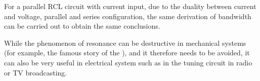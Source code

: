 For a parallel RCL circuit with current input, due to the duality between 
current and voltage, parallel and series configuration, the same derivation
of bandwidth can be carried out to obtain the same conclusions. 

While the phenomenon of resonance can be destructive in mechanical systems
(for example, the famous story of the
),
and it therefore needs to be avoided, it can also be very useful in electrical
system such as in the tuning circuit in radio or TV broadcasting.


\begin{comment}

{\bf Summary:}
\begin{itemize}

\item The resonant frequency of both series and parallel RCL circuits is
  completely determined by $L$ and $C$: $\omega_n=1/\sqrt{LC}$, independent 
  of the resistance $R$ in the circuit.

\item At the resonant frequency $\omega=\omega_n$, the impedance $Z=1/Y$ of
  a series RCL circuit is real and minimized (admittance maximized), and the 
  current through the three components reaches maximum; the admittance $Y=1/Z$ 
  of a parallel RCL circuit is real and minimized (impedance maximized), and 
  the voltage across the three components reaches maximum. 

\item In series RCL with voltage input and parallel RCL with current input, 
  the quality factor $Q$ is proportional to the ratio between $L$ and $C$:
  \[ 
  Q_s=\frac{1}{R}\sqrt{\frac{L}{C}},\;\;\;\;Q_p=R\sqrt{\frac{C}{L}}=\frac{1}{Q_s} 
  \]

\item In series RCL, $Q_s$ is inversely proportional to $R$ (the larger $R$, 
  the smaller $Q_s$, and the wider bandwidth), while in parallel RCL, $Q_p$ 
  is proportional to $R$ (the larger $R$, the larger $Q_p$,
  and the narrower bandwidth).
\end{itemize}



  See \htmladdnormallink{this website}{http://fourier.eng.hmc.edu/e80/active_filter/index.html} for more detailed discussions of second-order systems.

\end{comment}


